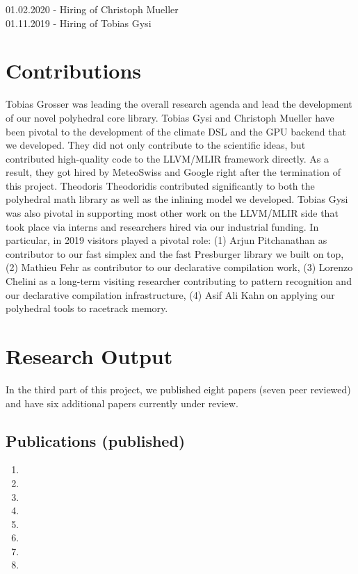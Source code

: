 \documentclass[11pt, manuscript,\review anonymous]{acmart}
\begin{document}
01.02.2020 - Hiring of Christoph Mueller\\
01.11.2019 - Hiring of Tobias Gysi

\section{Contributions}

Tobias Grosser was leading the overall research agenda and lead the development
of our novel polyhedral core library. Tobias Gysi and Christoph Mueller have
been pivotal to the development of the climate DSL and the GPU backend that we
developed. They did not only contribute to the scientific ideas, but
contributed high-quality code to the LLVM/MLIR framework directly. As a result,
they got hired by MeteoSwiss and Google right after the termination of this
project. Theodoris Theodoridis contributed significantly to both the polyhedral
math library as well as the inlining model we developed. Tobias Gysi was also
pivotal in supporting most other work on the LLVM/MLIR side that took place via
interns and researchers hired via our industrial funding. In particular, in
2019 visitors played a pivotal role: (1) Arjun Pitchanathan as contributor
to our fast simplex and the fast Presburger library we built on top, (2)
Mathieu Fehr as contributor to our declarative compilation work, (3) Lorenzo
Chelini as a long-term visiting researcher contributing to pattern recognition
and our declarative compilation infrastructure, (4) Asif Ali Kahn on applying
our polyhedral tools to racetrack memory.

\section{Research Output}

In the third part of this project, we published eight papers (seven peer
reviewed) and have six additional papers currently under review.

\subsection{Publications (published)}
\begin{enumerate}
	\item {}
	\item {}
	\item {}
	\item {}
	\item {}
	\item {}
	\item {}
	\item {}
\end{enumerate}
\end{document}
